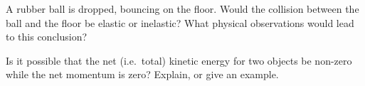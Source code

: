 \documentclass[addpoints,12pt]{exam}
\begin{document}
\begin{questions}
%    


  \question[5] A rubber ball is dropped, bouncing on the floor. Would the
  collision between the ball and the floor be elastic or inelastic? What
  physical observations would lead to this conclusion?
  \vspace{\stretch1}

  \question[5] Is it possible that the net (i.e.\ total) kinetic energy for two
  objects be non-zero while the net momentum is zero? Explain, or give an
  example.
  \vspace{\stretch1}
  \newpage
  
%  



\end{questions}
\end{document}
